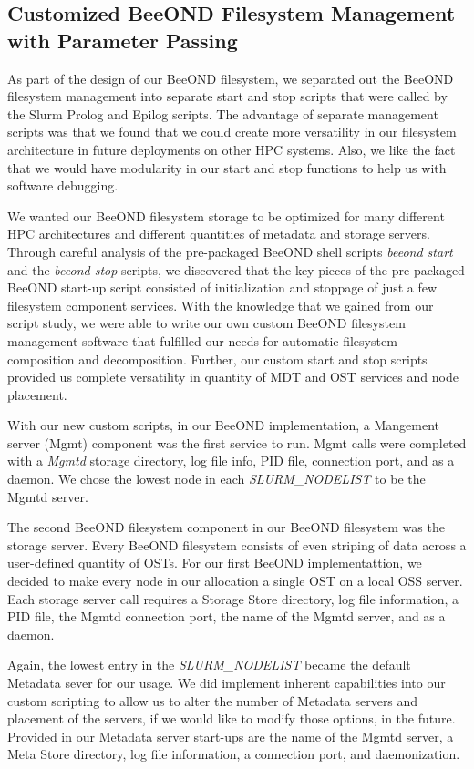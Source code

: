 \subsection{Customized BeeOND Filesystem Management with Parameter Passing}

As part of the design of our BeeOND filesystem, we separated out the BeeOND filesystem management into separate start and stop scripts that were called by the Slurm Prolog and Epilog scripts.  The advantage of separate  management scripts was that we found that we could create more versatility in our filesystem architecture in future deployments on other HPC systems.  Also, we like the fact that we would have modularity in our start and stop functions to help us with software debugging.  

We wanted our BeeOND filesystem storage to be optimized for many different HPC architectures and different quantities of metadata and storage servers.  Through careful analysis of the pre-packaged BeeOND shell scripts \textit{beeond start} and the \textit{beeond stop} scripts, we discovered that the key pieces of the pre-packaged BeeOND start-up script consisted of initialization and stoppage of just a few filesystem component services.  With the knowledge that we gained from our script study, we were able to write our own custom BeeOND filesystem management software that fulfilled our needs for automatic filesystem composition and decomposition.  Further, our custom start and stop scripts provided us complete versatility in quantity of MDT and OST services and node placement.  

With our new custom scripts, in our BeeOND implementation, a Mangement server (Mgmt) component was the first service to run.  Mgmt calls were completed with a \textit {Mgmtd} storage directory, log file info, PID file, connection port, and as a daemon.  We chose the lowest node in each \textit {SLURM\_NODELIST} to be the Mgmtd server.

The second BeeOND filesystem component in our BeeOND filesystem  was the storage server.  Every BeeOND filesystem consists of even striping of data across a user-defined quantity of OSTs.  For our first BeeOND implementattion, we decided to make every node in our allocation a single OST on a local OSS server.  Each storage server call requires a Storage Store directory, log file information, a PID file, the Mgmtd connection port, the name of the Mgmtd server, and as a daemon. 

Again, the lowest entry in the \textit{SLURM\_NODELIST} became the default Metadata sever for our usage.  We did implement inherent capabilities into our custom scripting to allow us to alter the number of Metadata servers and placement of the servers, if we would like to modify those options, in the future.  Provided in our Metadata server start-ups are the name of the Mgmtd server, a Meta Store directory, log file information, a connection port, and daemonization.

